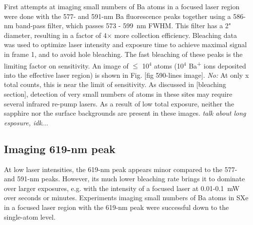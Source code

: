 First attempts at imaging small numbers of Ba atoms in a focused laser region were done with the 577- and 591-nm Ba fluorescence peaks together using a 586-nm band-pass filter, which passes 573 - 599~nm FWHM.  This filter has a 2" diameter, resulting in a factor of 4$\times$ more collection efficiency.  Bleaching data was used to optimize laser intensity and exposure time to achieve maximal signal in frame 1, and to avoid hole bleaching.  The fast bleaching of these peaks is the limiting factor on sensitivity.  An image of $\leq$ 10$^{4}$ atoms (10$^{4}$ Ba\textsuperscript{+} ions deposited into the effective laser region) is shown in Fig. [fig 590-lines image].  \emph{\color{red}No:} At only x total counts, this is near the limit of sensitivity.  As discussed in [bleaching section], detection of very small numbers of atoms in these sites may require several infrared re-pump lasers.  As a result of low total exposure, neither the sapphire nor the surface backgrounds are present in these images.  \emph{\color{gray}talk about long esposure, idk...}

\subsection{Imaging 619-nm peak}

At low laser intensities, the 619-nm peak appears minor compared to the 577- and 591-nm peaks.  However, its much lower bleaching rate brings it to dominate over larger exposures, e.g. with the intensity of a focused laser at 0.01-0.1~mW over seconds or minutes.  Experiments imaging small numbers of Ba atoms in SXe in a focused laser region with the 619-nm peak were successful down to the single-atom level.

